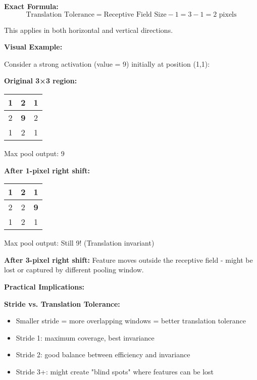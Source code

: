 \documentclass[12pt]{article}
\newcommand{\explanation}[1]{{\color{explanationcolor}#1}}
\begin{document}
\begin{enumerate}[(a)]
{{    \textbf{Exact Formula:}
    \[
    \text{Translation Tolerance} = \text{Receptive Field Size} - 1 = 3 - 1 = 2 \text{ pixels}
    \]
    
    This applies in both horizontal and vertical directions.
    }
    
    \textbf{Visual Example:}
    
    \explanation{
    Consider a strong activation (value = 9) initially at position (1,1):
    
    \textbf{Original 3×3 region:}
    \begin{center}
    \begin{tabular}{|c|c|c|}
    \hline
    1 & 2 & 1 \\
    \hline
    2 & \textbf{9} & 2 \\
    \hline
    1 & 2 & 1 \\
    \hline
    \end{tabular}
    \end{center}
    Max pool output: 9
    
    \textbf{After 1-pixel right shift:}
    \begin{center}
    \begin{tabular}{|c|c|c|}
    \hline
    1 & 2 & 1 \\
    \hline
    2 & 2 & \textbf{9} \\
    \hline
    1 & 2 & 1 \\
    \hline
    \end{tabular}
    \end{center}
    Max pool output: Still 9! (Translation invariant)
    
    \textbf{After 3-pixel right shift:}
    Feature moves outside the receptive field - might be lost or captured by different pooling window.
    }
    
    \textbf{Practical Implications:}
    
    \explanation{
    \textbf{Stride vs. Translation Tolerance:}
    \begin{itemize}
        \item Smaller stride = more overlapping windows = better translation tolerance
        \item Stride 1: maximum coverage, best invariance
        \item Stride 2: good balance between efficiency and invariance
        \item Stride 3+: might create "blind spots" where features can be lost
    \end{itemize}
    
}}
\end{enumerate}
\end{document}

